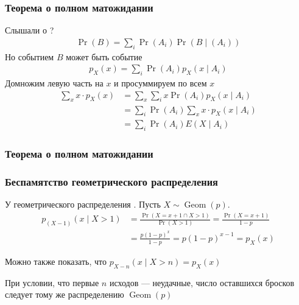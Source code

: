 \documentclass[hyperref=unicode,graphics=pdflatex,13pt,xcolor={usenames,dvipsnames}]{beamer}
\renewcommand\emph[1]{{\color{blue}{#1}}}
\DeclareMathOperator{\Geom}{Geom}
\begin{document}
\begin{frame}
  \frametitle{Теорема о полном матожидании}
  Слышали о \emph{полной вероятности}?
  \begin{align*}
    \Pr(B) = \sum_i \Pr(A_i) \Pr(B \mid (A_i)) 
  \end{align*}
  \pause
  Но событием $B$ может быть событие \emph{$X = x$}
  \begin{align*}
    p_X(x) = \sum_i \Pr(A_i) p_X(x \mid A_i) 
  \end{align*}
  \pause
  Домножим левую часть на $x$ и просуммируем по всем $x$
  \begin{align*}
    \sum_x x \cdot p_X(x) &= \sum_x \sum_i x \Pr(A_i) p_X(x \mid A_i) \\
                          &= \sum_i \Pr(A_i) \sum_x  x \cdot p_X(x \mid A_i) \\
                          &= \sum_i \Pr(A_i) E(X \mid A_i)
  \end{align*}
\end{frame}

\begin{frame}
  \frametitle{Теорема о полном матожидании}

  \begin{center}
  \end{center}
\end{frame}

\begin{frame}
  \frametitle{Беспамятство геометрического распределения}

  У геометрического распределения \emph{нет памяти}. Пусть $X \sim \Geom(p)$.
  \begin{align*}
    p_{(X - 1)}(x \mid X > 1) &= \frac{\Pr(X = x + 1 \cap X > 1)}{\Pr(X > 1)} = \frac{\Pr(X = x + 1)}{1 - p} \\
    &= \frac{p(1 - p)^x}{1 - p} = p(1 - p)^{x - 1} = p_X(x)
  \end{align*}

  \vspace{1cm}
  \pause
  Можно также показать, что $p_{X - n}(x \mid X > n) = p_X(x)$

  \vspace{1cm}
  \pause
  При условии, что первые $n$ исходов --- неудачные, число оставшихся бросков следует тому же распределению $\Geom(p)$
\end{frame}
\end{document}
